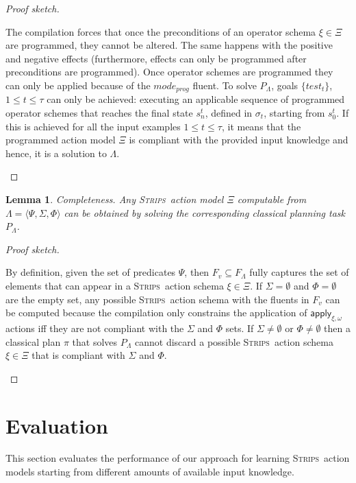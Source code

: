 \documentclass{article}
\newcommand{\tup}[1]{{\langle #1 \rangle}}
\newcommand{\strips}{\textsc{Strips}}     %
\newtheorem{lemma}[theorem]{Lemma}
\begin{document}
\begin{proof}[Proof sketch]
\begin{small}
The compilation forces that once the preconditions of an operator schema $\xi \in \Xi$ are programmed, they cannot be altered. The same happens with the positive and negative effects (furthermore, effects can only be programmed after preconditions are programmed). Once operator schemes are programmed they can only be applied because of the $mode_{prog}$ fluent. To solve $P_{\Lambda}$, goals $\{test_t\}$, {\small $1\leq t\leq \tau$} can only be achieved: executing an applicable sequence of programmed operator schemes that reaches the final state $s_n^t$, defined in $\sigma_t$, starting from $s_0^t$. If this is achieved for all the input examples {\small $1\leq t\leq \tau$}, it means that the programmed action model $\Xi$ is compliant with the provided input knowledge and hence, it is a solution to $\Lambda$.
\end{small}
\end{proof}


\begin{lemma}
Completeness. Any \strips\ action model $\Xi$ computable from $\Lambda=\tup{\Psi,\Sigma,\Phi}$ can be obtained by solving the corresponding classical planning task $P_{\Lambda}$.
\end{lemma}

\begin{proof}[Proof sketch]
\begin{small}
By definition, given the set of predicates $\Psi$, then $F_v\subseteq F_\Lambda$ fully captures the set of elements that can appear in a \strips\ action schema $\xi\in\Xi$. If $\Sigma=\emptyset$ and $\Phi=\emptyset$ are the empty set, any possible \strips\ action schema with the fluents in $F_v$ can be computed because the compilation only constrains the application of $\mathsf{apply_{\xi,\omega}}$ actions iff they are not compliant with the $\Sigma$ and $\Phi$ sets. If $\Sigma\neq\emptyset$ or $\Phi\neq\emptyset$ then a classical plan $\pi$ that solves $P_{\Lambda}$ cannot discard a possible \strips\ action schema $\xi\in\Xi$ that is compliant with $\Sigma$ and $\Phi$.
\end{small}
\end{proof}


\section{Evaluation}
This section evaluates the performance of our approach for learning \strips\ action models starting from different amounts of available input knowledge.
\end{document}
